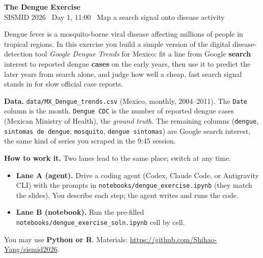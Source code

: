 \documentclass[11pt]{article}
\begin{document}
\begin{center}
  {\Large\bfseries The Dengue Exercise}\\[2pt]
  {\normalsize SISMID 2026 \textbullet\ Day 1, 11:00 \textbullet\ Map a search signal onto disease activity}
\end{center}

\medskip

Dengue fever is a mosquito-borne viral disease affecting millions of people in tropical
regions. In this exercise you build a simple version of the digital disease-detection tool
\emph{Google Dengue Trends} for Mexico: fit a line from Google \textbf{search} interest to
reported dengue \textbf{cases} on the early years, then use it to predict the later years
from search alone, and judge how well a cheap, fast search signal stands in for slow
official case reports.

\textbf{Data.} \texttt{data/MX\_Dengue\_trends.csv} (Mexico, monthly, 2004--2011). The
\texttt{Date} column is the month. \texttt{Dengue CDC} is the number of reported dengue
cases (Mexican Ministry of Health), the \emph{ground truth}. The remaining columns
(\texttt{dengue}, \texttt{sintomas de dengue}, \texttt{mosquito}, \texttt{dengue sintomas})
are Google search interest, the same kind of series you scraped in the 9:45 session.

\textbf{How to work it.} Two lanes lead to the same place; switch at any time.
\begin{itemize}[nosep]
  \item \textbf{Lane A (agent).} Drive a coding agent (Codex, Claude Code, or Antigravity
        CLI) with the prompts in \texttt{notebooks/dengue\_exercise.ipynb} (they match the
        slides). You describe each step; the agent writes and runs the code.
  \item \textbf{Lane B (notebook).} Run the pre-filled
        \texttt{notebooks/dengue\_exercise\_soln.ipynb} cell by cell.
\end{itemize}
You may use \textbf{Python or R}. Materials: \url{https://github.com/Shihao-Yang/sismid2026}.
\end{document}
